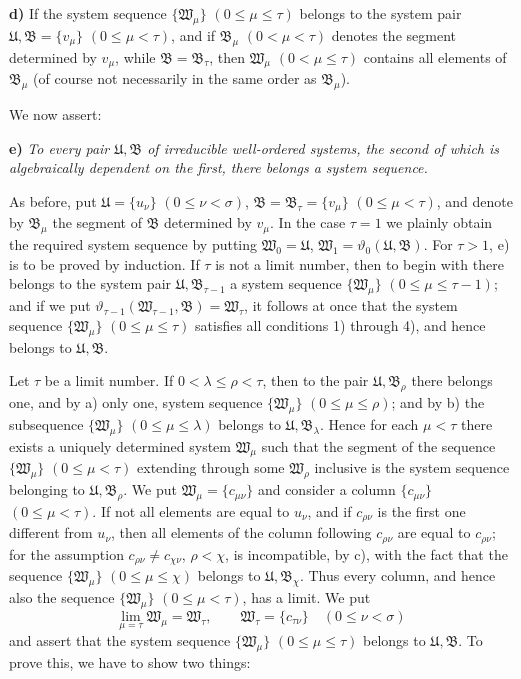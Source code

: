 \textbf{d)} If the system sequence \(\{\mathfrak W_\mu\}\) \((0\leq\mu\leq\tau)\) belongs to the system pair \(\mathfrak U,\mathfrak B=\{v_\mu\}\) \((0\leq\mu<\tau)\), and if \(\mathfrak B_\mu\) \((0<\mu<\tau)\) denotes the segment determined by \(v_\mu\), while \(\mathfrak B=\mathfrak B_\tau\), then \(\mathfrak W_\mu\) \((0<\mu\leq\tau)\) contains all elements of \(\mathfrak B_\mu\) (of course not necessarily in the same order as \(\mathfrak B_\mu\)).

We now assert:

\textbf{e)} \emph{To every pair \(\mathfrak U,\mathfrak B\) of irreducible well-ordered systems, the second of which is algebraically dependent on the first, there belongs a system sequence.}

As before, put \(\mathfrak U=\{u_\nu\}\) \((0\leq\nu<\sigma)\), \(\mathfrak B=\mathfrak B_\tau=\{v_\mu\}\) \((0\leq\mu<\tau)\), and denote by \(\mathfrak B_\mu\) the segment of \(\mathfrak B\) determined by \(v_\mu\). In the case \(\tau=1\) we plainly obtain the required system sequence by putting \(\mathfrak W_0=\mathfrak U\), \(\mathfrak W_1=\vartheta_0(\mathfrak U,\mathfrak B)\). For \(\tau>1\), e) is to be proved by induction. If \(\tau\) is not a limit number, then to begin with there belongs to the system pair \(\mathfrak U,\mathfrak B_{\tau-1}\) a system sequence \(\{\mathfrak W_\mu\}\) \((0\leq\mu\leq\tau-1)\); and if we put \(\vartheta_{\tau-1}(\mathfrak W_{\tau-1},\mathfrak B)=\mathfrak W_\tau\), it follows at once that the system sequence \(\{\mathfrak W_\mu\}\) \((0\leq\mu\leq\tau)\) satisfies all conditions 1) through 4), and hence belongs to \(\mathfrak U,\mathfrak B\).

Let \(\tau\) be a limit number. If \(0<\lambda\leq\rho<\tau\), then to the pair \(\mathfrak U,\mathfrak B_\rho\) there belongs one, and by a) only one, system sequence \(\{\mathfrak W_\mu\}\) \((0\leq\mu\leq\rho)\); and by b) the subsequence \(\{\mathfrak W_\mu\}\) \((0\leq\mu\leq\lambda)\) belongs to \(\mathfrak U,\mathfrak B_\lambda\). Hence for each \(\mu<\tau\) there exists a uniquely determined system \(\mathfrak W_\mu\) such that the segment of the sequence \(\{\mathfrak W_\mu\}\) \((0\leq\mu<\tau)\) extending through some \(\mathfrak W_\rho\) inclusive is the system sequence belonging to \(\mathfrak U,\mathfrak B_\rho\). We put \(\mathfrak W_\mu=\{c_{\mu\nu}\}\) and consider a column \(\{c_{\mu\nu}\}\) \((0\leq\mu<\tau)\). If not all elements are equal to \(u_\nu\), and if \(c_{\rho\nu}\) is the first one different from \(u_\nu\), then all elements of the column following \(c_{\rho\nu}\) are equal to \(c_{\rho\nu}\); for the assumption \(c_{\rho\nu}\neq c_{\chi\nu}\), \(\rho<\chi\), is incompatible, by c), with the fact that the sequence \(\{\mathfrak W_\mu\}\) \((0\leq\mu\leq\chi)\) belongs to \(\mathfrak U,\mathfrak B_\chi\). Thus every column, and hence also the sequence \(\{\mathfrak W_\mu\}\) \((0\leq\mu<\tau)\), has a limit. We put
\[
\lim_{\mu=\tau}\mathfrak W_\mu=\mathfrak W_\tau,
\qquad
\mathfrak W_\tau=\{c_{\tau\nu}\}\quad(0\leq\nu<\sigma)
\]
and assert that the system sequence \(\{\mathfrak W_\mu\}\) \((0\leq\mu\leq\tau)\) belongs to \(\mathfrak U,\mathfrak B\). To prove this, we have to show two things:

